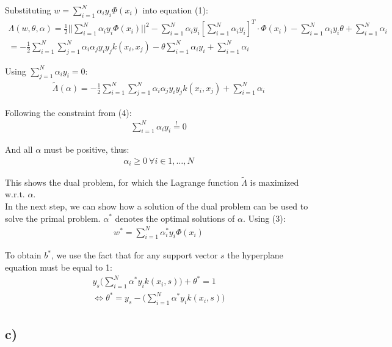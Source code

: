 \documentclass{article}
\begin{document}
Substituting $w = \sum_{i=1}^N \alpha_i y_i \Phi(x_i)$ into equation (1):
\begin{align}
    \Lambda(w,\theta,\alpha) = \frac{1}{2} \bigg|\bigg|{\sum_{i=1}^N \alpha_i y_i \Phi(x_i)}\bigg|\bigg|^2 - \sum_{i=1}^N \alpha_i y_i[\sum_{i=1}^N \alpha_i y_i]^T \cdot \Phi(x_i) - \sum_{i=1}^N \alpha_i y_i \theta + \sum_{i=1}^N \alpha_i \\
    = -\frac{1}{2} \sum_{i=1}^N \sum_{j=1}^N \alpha_i \alpha_j y_i y_j k(x_i, x_j) - \theta \sum_{i=1}^N \alpha_i y_i + \sum_{i=1}^N \alpha_i ~~~~~~~~~~~~~~~
\end{align}

Using $\sum_{j=1}^N \alpha_i y_i = 0$: 
\begin{align}
    \tilde{\Lambda}(\alpha) = - \frac{1}{2}  \sum_{i=1}^N \sum_{j=1}^N \alpha_i \alpha_j y_i y_j k(x_i, x_j) + \sum_{i=1}^N \alpha_i
\end{align}

Following the constraint from (4):
\begin{align}
    \sum_{i=1}^N \alpha_i y_i \stackrel{!}{=} 0
\end{align}

And all $\alpha$ must be positive, thus:
\begin{align}
    \alpha_i \geq 0 \ \forall i \in 1, \dots, N
\end{align}

This shows the dual problem, for which the Lagrange function $\tilde{\Lambda}$ is maximized w.r.t. $\alpha$. \\

In the next step, we can show how a solution of the dual problem can be used to solve the primal problem. $\alpha^\ast$ denotes the optimal solutions of $\alpha$. Using (3):
\begin{align}
    w^\ast = \sum_{i=1}^N \alpha_i^\ast y_i \Phi(x_i)
\end{align}

To obtain $b^\ast$, we use the fact that for any support vector $s$ the hyperplane equation must be equal to 1:
\begin{align}
    y_s \bigg(\sum_{i=1}^N \alpha^\ast y_i k(x_i, s) \bigg) + \theta^\ast = 1 \\
    \Longleftrightarrow \theta^\ast = y_s - \bigg( \sum_{i=1}^N \alpha^\ast y_i k(x_i, s) \bigg)
\end{align}

\subsection*{c)}
\end{document}

